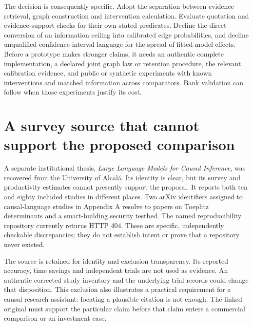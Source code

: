 The decision is consequently specific. Adopt the separation between
evidence retrieval, graph construction and intervention calculation.
Evaluate quotation and evidence-support checks for their own stated
predicates. Decline the direct conversion of an information ceiling into
calibrated edge probabilities, and decline unqualified confidence-interval
language for the spread of fitted-model effects. Before a prototype makes
stronger claims, it needs an authentic complete implementation, a declared
joint graph law or retention procedure, the relevant calibration evidence,
and public or synthetic experiments with known interventions and matched
information across comparators. Bank validation can follow when those
experiments justify its cost.

\section{A survey source that cannot support the proposed comparison}

A separate institutional thesis, \emph{Large Language Models for Causal
Inference}, was recovered from the University of Alcal\'a. Its identity is
clear, but its survey and productivity estimates cannot presently support
the proposal. It reports both ten and eighty included studies in different
places. Two arXiv identifiers assigned to causal-language studies in
Appendix A resolve to papers on Toeplitz determinants and a smart-building
security testbed. The named reproducibility repository currently returns
HTTP 404. These are specific, independently checkable discrepancies;
they do not establish intent or prove that a repository never existed.
\citep[Section 4.1, Tables 5--6 and 9, Section 5.4.3, Appendix A]
{closure30aitlhouss}

The source is retained for identity and exclusion transparency. Its reported
accuracy, time savings and independent trials are not used as evidence.
An authentic corrected study inventory and the underlying trial records
could change that disposition. This exclusion also illustrates a practical
requirement for a causal research assistant: locating a plausible citation
is not enough. The linked original must support the particular claim before
that claim enters a commercial comparison or an investment case.

